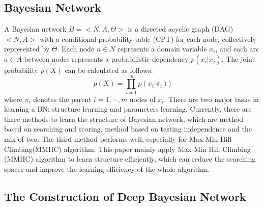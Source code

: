\documentclass[10pt,twocolumn,letterpaper]{article}
\begin{document}
\subsection{Bayesian Network}
A Bayesian network $B=<N,A,\Theta>$ is a directed acyclic graph (DAG) $<N,A>$ with a conditional probability table (CPT) for each node, collectively represented by $\Theta$. Each node $n \in N$ represents a domain variable $x_i$, and each arc $a \in A$ between nodes represents a probabilistic dependency $p(x_i|x_j)$. The joint probability $p(X)$ can be calculated as follows:
\begin{equation}
p(X) =\prod_{i=1}^m p(x_i |\pi_i))
\end{equation}
where $\pi_i$ denotes the parent $i=1,\cdots,m$ nodes of $x_i$.
There are two major tasks in learning a BN: structure learning and parameters learning. Currently, there are three methods to learn the structure of Bayesian network, which are method based on searching and scoring, method based on testing independence and the mix of two. The third method performs well, especially for Max-Min Hill Climbing(MMHC) algorithm. This paper mainly apply  Max-Min Hill Climbing (MMHC) algorithm to learn structure  efficiently, which can reduce the searching spaces and  improve the learning efficiency of the whole algorithm.





\subsection{The Construction of Deep Bayesian Network}
\end{document}
